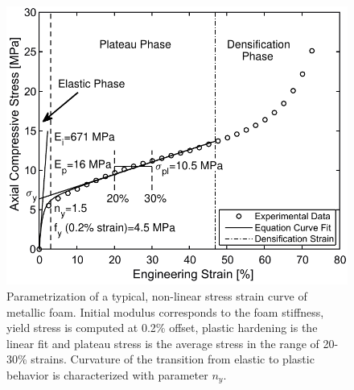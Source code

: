 \documentclass[review]{elsarticle}
\begin{document}
\begin{figure}[htbp]
	\begin{center}
		\includegraphics[width=0.75\linewidth]{Tex-Figures/Fig07.pdf}
		\caption{Parametrization of a typical, non-linear stress strain curve of metallic foam. Initial modulus corresponds to the foam stiffness, yield stress is computed at 0.2\% offset, plastic hardening is the linear fit and plateau stress is the average stress in the range of 20-30\% strains. Curvature of the transition from elastic to plastic behavior is characterized with parameter $n_y$.}
		\label{fig:MetFoaBeh}
	\end{center}
\end{figure}
\end{document}
